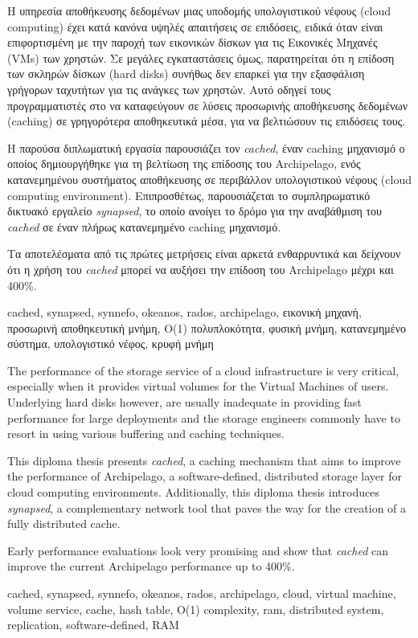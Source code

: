 \begin{abstractgr}
	Η υπηρεσία αποθήκευσης δεδομένων μιας υποδομής υπολογιστικού νέφους 
	(cloud computing) έχει κατά κανόνα υψηλές απαιτήσεις σε επιδόσεις, 
	ειδικά όταν είναι επιφορτισμένη με την παροχή των εικονικών δίσκων για 
	τις Εικονικές Μηχανές (VMs) των χρηστών. Σε μεγάλες εγκαταστάσεις όμως, 
	παρατηρείται ότι η επίδοση των σκληρών δίσκων (hard disks) συνήθως δεν 
	επαρκεί για την εξασφάλιση γρήγορων ταχυτήτων για τις ανάγκες των 
	χρηστών. Αυτό οδηγεί τους προγραμματιστές στο να καταφεύγουν σε λύσεις 
	προσωρινής αποθήκευσης δεδομένων (caching) σε γρηγορότερα αποθηκευτικά 
	μέσα, για να βελτιώσουν τις επιδόσεις τους.
	
	Η παρούσα διπλωματική εργασία παρουσιάζει τον \textit{cached}, έναν 
	caching μηχανισμό ο οποίος δημιουργήθηκε για τη βελτίωση της επίδοσης 
	του Archipelago, ενός κατανεμημένου συστήματος αποθήκευσης σε 
	περιβάλλον υπολογιστικού νέφους (cloud computing environment).	
	Επιπροσθέτως, παρουσιάζεται το συμπληρωματικό δικτυακό εργαλείο 
	\textit{synapsed}, το οποίο ανοίγει το δρόμο για την αναβάθμιση του 
	\textit{cached} σε έναν πλήρως κατανεμημένο caching μηχανισμό.
	
	Τα αποτελέσματα από τις πρώτες μετρήσεις είναι αρκετά ενθαρρυντικά και 
	δείχνουν ότι η χρήση του \textit{cached} μπορεί να αυξήσει την επίδοση του 
	Archipelago μέχρι και 400\%.
	\begin{keywordsgr}
		cached, synapsed, synnefo, okeanos, rados, archipelago,  
		εικονική μηχανή, προσωρινή αποθηκευτική μνήμη, Ο(1) 
		πολυπλοκότητα, φυσική μνήμη, κατανεμημένο σύστημα, υπολογιστικό 
		νέφος, κρυφή μνήμη
	\end{keywordsgr}
\end{abstractgr}

\begin{abstracten}
	The performance of the storage service of a cloud infrastructure is very 
	critical, especially when it provides virtual volumes for the Virtual
	Machines of users. Underlying hard disks however, are usually inadequate in 
	providing fast performance for large deployments and the storage engineers 
	commonly have to resort in using various buffering and caching techniques.
	
	This diploma thesis presents \textit{cached}, a caching mechanism that 
	aims to improve the performance of Archipelago, a software-defined, 
	distributed storage layer for cloud computing environments.  
	Additionally, this diploma thesis introduces \textit{synapsed}, a 
	complementary network tool that paves the way for the creation of a 
	fully distributed cache.
	
	Early performance evaluations look very promising and show that 
	\textit{cached} can improve the current Archipelago performance up to 
	400\%.
	\begin{keywordsen}
		cached, synapsed, synnefo, okeanos, rados, archipelago, cloud, 
		virtual machine, volume service, cache, hash table,  O(1) 
		complexity, ram, distributed system, replication, 
		software-defined, RAM
	\end{keywordsen}
\end{abstracten}

\begin{acknowledgementsgr}
	\todo
\end{acknowledgementsgr}
